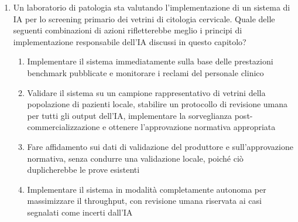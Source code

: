 \begin{enumerate}
    \item \label{ch5:q10} Un laboratorio di patologia sta valutando l'implementazione di un sistema di IA per lo screening primario dei vetrini di citologia cervicale. Quale delle seguenti combinazioni di azioni rifletterebbe meglio i principi di implementazione responsabile dell'IA discussi in questo capitolo?
    \begin{enumerate}[label=\Alph*.]
        \item Implementare il sistema immediatamente sulla base delle prestazioni benchmark pubblicate e monitorare i reclami del personale clinico
        \item Validare il sistema su un campione rappresentativo di vetrini della popolazione di pazienti locale, stabilire un protocollo di revisione umana per tutti gli output dell'IA, implementare la sorveglianza post-commercializzazione e ottenere l'approvazione normativa appropriata
        \item Fare affidamento sui dati di validazione del produttore e sull'approvazione normativa, senza condurre una validazione locale, poiché ciò duplicherebbe le prove esistenti
        \item Implementare il sistema in modalità completamente autonoma per massimizzare il throughput, con revisione umana riservata ai casi segnalati come incerti dall'IA
    \end{enumerate}

\end{enumerate}
